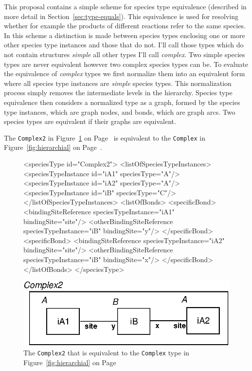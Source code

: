 \documentclass{cekarticle}
\begin{document}
This proposal contains a simple scheme for species type
equivalence (described in more detail in
Section~\ref{sec:type-equals}). This equivalence is used for
resolving whether for example the products of different reactions
refer to the same species. In this scheme a distinction is made
between species types enclosing one or more other species type
instances and those that do not.  I'll call those types which do
not contain  structures \emph{simple}
all other types I'll call \emph{complex}. Two simple species types
are never equivalent however two complex species types can be. To
evaluate the equivalence of \emph{complex} types we first
normalize them into an equivalent form where all species type
instances are \emph{simple} species types.  This normalization
process simply removes the intermediate levels in the hierarchy.
Species type equivalence then considers a normalized type as a
graph, formed by the species type instances, which are graph
nodes, and bonds, which are graph arcs. Two species types are
equivalent if their graphs are equivalent.

The \texttt{Complex2}  in Figure~\ref{fig:complex2} on Page~\pageref{fig:complex2} is
equivalent to the \texttt{Complex}  in Figure~\ref{fig:hierarchial} on
Page~\pageref{fig:hierarchial}.

\begin{figure}

\begin{example}
<speciesType id="Complex2">
    <listOfSpeciesTypeInstances>
        <speciesTypeInstance id="iA1" speciesType="A"/>
        <speciesTypeInstance id="iA2" speciesType="A"/>
        <speciesTypeInstance id="iB" speciesType="C"/>
    </listOfSpeciesTypeInstances>
    <listOfBonds>
        <specificBond>
            <bindingSiteReference speciesTypeInstance="iA1" bindingSite="site"/>
            <otherBindingSiteReference speciesTypeInstance="iB" bindingSite="y"/>
        </specificBond>
        <specificBond>
            <bindingSiteReference speciesTypeInstance="iA2" bindingSite="site"/>
            <otherBindingSiteReference speciesTypeInstance="iB" bindingSite="x"/>
        </specificBond>
    </listOfBonds>
</speciesType>
\end{example}
  \vspace*{8pt}
  \centering
  \includegraphics[scale = 0.7]{complex2.eps}
\caption{The \texttt{Complex2}  that is equivalent to the \texttt{Complex} type in
Figure~\ref{fig:hierarchial} on Page~\pageref{fig:hierarchial}}
\label{fig:complex2}
\end{figure}
\end{document}
